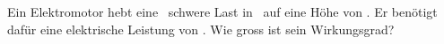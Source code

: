 Ein Elektromotor hebt eine \mlaO\ schwere Last in \tlaO\ auf eine Höhe von \hlaO. Er benötigt dafür eine elektrische Leistung von \PelO. Wie gross ist sein Wirkungsgrad?
